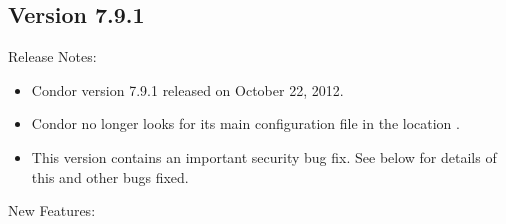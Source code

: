 \subsection*{\label{sec:New-7-9-1}Version 7.9.1}

\noindent Release Notes:

\begin{itemize}

\item Condor version 7.9.1 released on October 22, 2012.

\item Condor no longer looks for its main configuration file in the
location .

\item \Security This version contains an important security bug fix.  See below
for details of this and other bugs fixed.

\end{itemize}


\noindent New Features:

